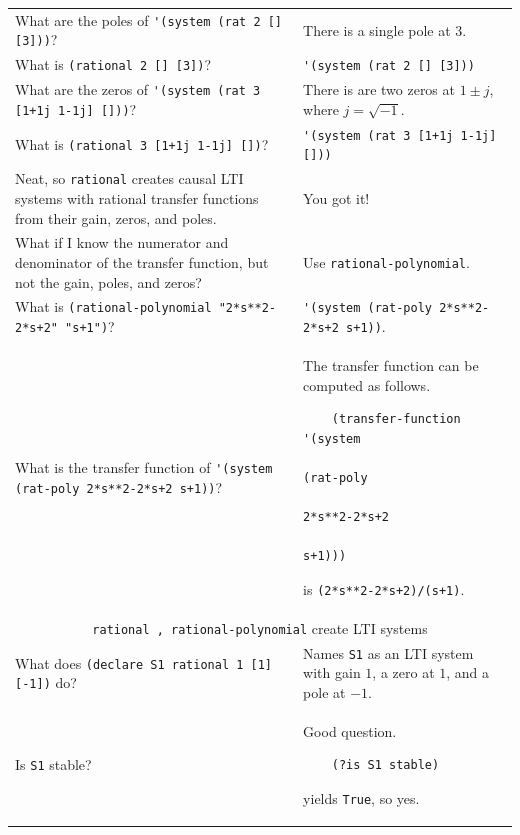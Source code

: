 \documentclass[11pt,letter]{article}
\begin{document}
\begin{longtable}{ p{} p{} }
  What are the poles of \lstinline!'(system (rat 2 [] [3]))!?
  &
  There is a single pole at $3$. \\

  What is \lstinline!(rational 2 [] [3])!?
  &
  \lstinline!'(system (rat 2 [] [3]))! \\

  What are the zeros of \lstinline!'(system (rat 3 [1+1j 1-1j] []))!?
  &
  There is are two zeros at $1\pm j$, where $j=\sqrt{-1}$. \\

  What is \lstinline!(rational 3 [1+1j 1-1j] [])!?
  &
  \lstinline!'(system (rat 3 [1+1j 1-1j] []))! \\

  Neat, so \lstinline!rational! creates causal LTI systems with rational transfer functions from their gain, zeros, and poles.
  &
  You got it! \\

  What if I know the numerator and denominator of the transfer function, but not the gain, poles, and zeros?
  &
  Use \lstinline!rational-polynomial!. \\

  What is \lstinline!(rational-polynomial "2*s**2-2*s+2" "s+1")!?
  &
  \lstinline!'(system (rat-poly 2*s**2-2*s+2 s+1))!. \\

  What is the transfer function of \lstinline!'(system (rat-poly 2*s**2-2*s+2 s+1))!?
  &
  The transfer function can be computed as follows.
  \begin{lstlisting}
    (transfer-function '(system
                          (rat-poly
                            2*s**2-2*s+2
                            s+1)))
  \end{lstlisting}
  is \lstinline!(2*s**2-2*s+2)/(s+1)!.\\

  \midrule

  \multicolumn{2}{c}{\Large\lstinline!rational , rational-polynomial! create LTI systems} \\

  \midrule

  What does \lstinline!(declare S1 rational 1 [1] [-1])! do?
  &
  Names \lstinline!S1! as an LTI system with gain $1$, a zero at $1$, and a pole at $-1$. \\

  Is \lstinline!S1! stable?
  &
  Good question.
  \begin{lstlisting}
    (?is S1 stable)
  \end{lstlisting}
  yields \lstinline!True!, so yes. \\


\end{longtable}
\end{document}

